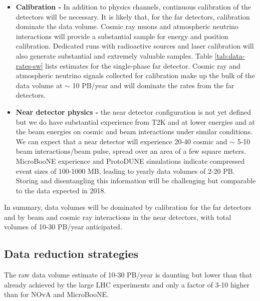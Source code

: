 \begin{itemize}
\item
{\bf Calibration - }
In addition to physics channels, continuous calibration of the detectors will be necessary.  It is likely that, for the far detectors, calibration dominate the data volume. Cosmic ray muons and atmospheric neutrino interactions will provide a substantial sample for energy and position calibration.  Dedicated runs with radioactive sources and laser calibration will also generate substantial and extremely valuable samples. Table \ref{tab:data-rates-sw} lists estimates for the single-phase far detector.   Cosmic ray and atmospheric neutrino signals collected for calibration make up the bulk of the data volume at $\sim$ 10 PB/year and will dominate the rates from the far detectors.  %

\item {\bf Near detector physics -} the near detector configuration is not yet defined  but we do have substantial experience from T2K and   at lower energies and   at the   beam energies on cosmic and beam interactions under similar conditions.  We can expect that a near detector will experience 20-40 cosmic and $\sim$ 5-10 beam interactions/beam pulse, spread over an area of a few square meters. MicroBooNE experience and ProtoDUNE simulations indicate compressed event sizes of 100-1000 MB, leading to yearly data volumes of 2-20 PB.  Storing and disentangling this information will be challenging but comparable to the  data expected in 2018.

\end{itemize}

In summary, data volumes will be dominated by calibration for the far detectors and by beam and cosmic ray interactions in the near detectors, with total volumes of 10-30 PB/year anticipated. 



\subsection{Data reduction strategies}

The raw data volume estimate of 10-30 PB/year is daunting but lower than that already achieved by the large LHC experiments and only a factor of 3-10 higher than for NOvA and MicroBooNE. 

